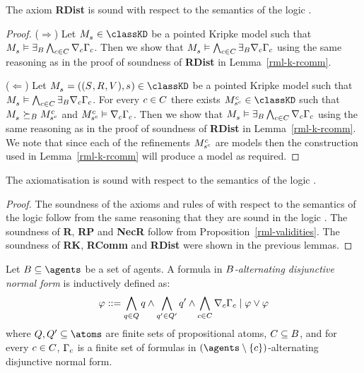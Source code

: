 \begin{lemma}
The axiom {\bf RDist} is sound with respect to the semantics of the logic \logicRmlKD{}.
\end{lemma}

\begin{proof}
($\Rightarrow$) Let $\kPModel{\kStateS} \in \classKD$ be a pointed Kripke model such that $\kPModel{\kStateS} \entails \somerefsBs \bigwedge_{\agentC \in \agentsC} \coversC \Gamma_\agentC$.
Then we show that $\kPModel{\kStateS} \entails \bigwedge_{\agentC \in \agentsC} \somerefsBs \coversC \Gamma_\agentC$ using the same reasoning as in the proof of soundness of {\bf RDist} in Lemma~\ref{rml-k-rcomm}.

($\Leftarrow$) Let $\kPModelAndTuple{\kStateS} \in \classKD$ be a pointed Kripke model such that $\kPModel{\kStateS} \entails \bigwedge_{\agentC \in \agentsC} \somerefsBs \coversC \Gamma_\agentC$.
For every $\agentC \in \agentsC$ there exists $\kPModel[\agentC]{\kStateS[\agentC]} \in \classKD$ such that $\kPModel{\kStateS} \simulatesBs \kPModel[\agentC]{\kStateS[\agentC]}$ and $\kPModel[\agentC]{\kStateS[\agentC]} \entails \coversC \Gamma_\agentC$.
Then we show that $\kPModel{\kStateS} \entails \somerefsBs \bigwedge_{\agentC \in \agentsC} \coversC \Gamma_\agentC$ using the same reasoning as in the proof of soundness of {\bf RDist} in Lemma~\ref{rml-k-rcomm}.
We note that since each of the refinements $\kPModel[\agentC]{\kStateS[\agentC]}$ are \classKD{} models then the construction used in Lemma~\ref{rml-k-rcomm} will produce a \classKD{} model as required.
\end{proof}

\begin{lemma}\label{rml-kd-sound}
The axiomatisation \axiomRmlKD{} is sound with respect to the semantics of the logic \logicRmlKD{}.
\end{lemma}

\begin{proof}
The soundness of the axioms and rules of \axiomKD{} with respect to the semantics of the logic \logicRmlKD{} follow from the same reasoning that they are sound in the logic \logicKD{}.
The soundness of {\bf R}, {\bf RP} and {\bf NecR} follow from Proposition~\ref{rml-validities}.
The soundness of {\bf RK}, {\bf RComm} and {\bf RDist} were shown in the previous lemmas.
\end{proof}

\begin{definition}
Let $\agentsB \subseteq \agents$ be a set of agents.
A formula in {\em $\agentsB$-alternating disjunctive normal form} is inductively defined as:
$$
\phi ::= \bigwedge_{\atomQ \in \atomsQ} \atomQ \land \bigwedge_{\atomQ' \in \atomsQ'} \atomQ' \land \bigwedge_{\agentC \in \agentsC} \coverC \Gamma_\agentC \mid \phi \lor \phi
$$
where $\atomsQ, \atomsQ' \subseteq \atoms$ are finite sets of propositional atoms, $\agentsC \subseteq \agentsB$, and for every $\agentC \in \agentsC$, $\Gamma_\agentC$ is a finite set of formulas in $(\agents \setminus \{\agentC\})$-alternating disjunctive normal form.
\end{definition}

